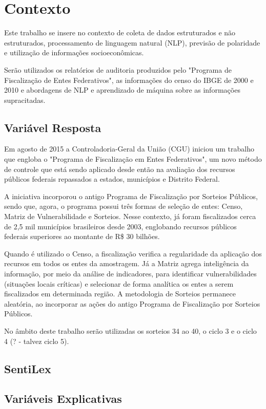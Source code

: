 \chapter{Contexto}
\label{cap:contexto}

Este trabalho se insere no contexto de coleta de dados estruturados e não estruturados, processamento de linguagem natural (NLP), previsão de polaridade e utilização de informações socioeconômicas.

Serão utilizados os relatórios de auditoria produzidos pelo "Programa de Fiscalização de Entes Federativos", as informações do censo do IBGE de 2000 e 2010 e abordagens de NLP e aprendizado de máquina sobre as informações supracitadas.

\section{Variável Resposta}
\label{sec:variavel_resposta}

Em agosto de 2015 a Controladoria-Geral da União (CGU) iniciou um trabalho que engloba o "Programa de Fiscalização em Entes Federativos", um novo método de controle que está sendo aplicado desde então na avaliação dos recursos públicos federais repassados a estados, municípios e Distrito Federal.

A iniciativa incorporou o antigo Programa de Fiscalização por Sorteios Públicos, sendo que, agora, o programa possui três formas de seleção de entes: Censo, Matriz de Vulnerabilidade e Sorteios. Nesse contexto, já foram fiscalizados cerca de 2,5 mil municípios brasileiros desde 2003, englobando recursos públicos federais superiores ao montante de R\$ 30 bilhões.

Quando é utilizado o Censo, a fiscalização verifica a regularidade da aplicação dos recursos em todos os entes da amostragem. Já a Matriz agrega inteligência da informação, por meio da análise de indicadores, para identificar vulnerabilidades (situações locais críticas) e selecionar de forma analítica os entes a serem fiscalizados em determinada região. A metodologia de Sorteios permanece aleatória, ao incorporar as ações do antigo Programa de Fiscalização por Sorteios Públicos.

No âmbito deste trabalho serão utilizadas os sorteios 34 ao 40, o ciclo 3 e o ciclo 4 (? - talvez ciclo 5).


\section{SentiLex}
\label{sec:sentilex}



\section{Variáveis Explicativas}
\label{sec:variaveis_explicativas}







